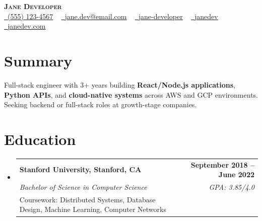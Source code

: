 \documentclass[letterpaper,10pt]{article}
\makeatletter
\newcommand{\resumeEduSubheading}[5]{\vspace{-1pt}\item\begin{tabular*}{1.0\textwidth}[t]{l@{\extracolsep{\fill}}r}\textbf{#1} & \textbf{\small #2} \\\textit{\small #3} & \textit{\small #4} \\\small #5 & \\\end{tabular*}\vspace{-4pt}}
\newcommand{\resumeSubHeadingListStart}{\begin{itemize}[leftmargin=0.0in, label={}]}
\newcommand{\resumeSubHeadingListEnd}{\end{itemize}}
\makeatother
\begin{document}
\begin{center}
{\Huge \scshape \textbf{Jane Developer}} \\ \vspace{1pt}
\small \href{tel:(555) 123-4567}{\faPhone\ \underline{(555) 123-4567}} ~ \href{mailto:jane.dev@email.com}{\raisebox{-0.2\height}\faEnvelope\ \underline{jane.dev@email.com}} ~
\href{https://www.linkedin.com/in/jane-developer/}{\raisebox{-0.2\height}\faLinkedin\ \underline{jane-developer}} ~ \href{https://github.com/janedev}{\raisebox{-0.2\height}\faGithub\ \underline{janedev}} ~
\href{https://janedev.com/}{\raisebox{-0.2\height}\faGlobe\ \underline{janedev.com}}
\end{center}
\vspace{-16pt}
\section{Summary}
\begin{itemize}[leftmargin=0.15in, label={}]
\small{\item{Full-stack engineer with 3+ years building \textbf{React/Node.js applications}, \textbf{Python APIs}, and \textbf{cloud-native systems} across AWS and GCP environments. Seeking backend or full-stack roles at growth-stage companies.}}
\end{itemize}
\vspace{-6pt}
\section{Education}
\resumeSubHeadingListStart
\resumeEduSubheading{Stanford University, Stanford, CA}{September 2018 -- June 2022}{Bachelor of Science in Computer Science}{GPA: 3.85/4.0}{Coursework: Distributed Systems, Database Design, Machine Learning, Computer Networks}
\resumeSubHeadingListEnd
\vspace{-6pt}
\end{document}
